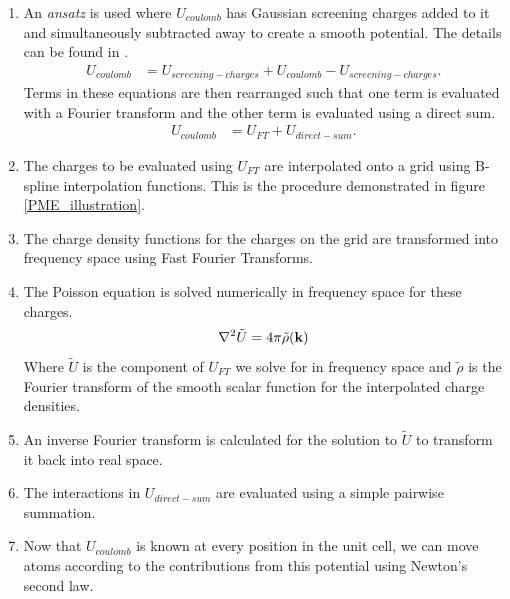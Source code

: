 \begin{enumerate}
	\item An \textit{ansatz}  is used where $U_{coulomb}$  has Gaussian screening charges added to it and simultaneously subtracted away to create a smooth potential. The details can be found in \cite{shan2005}.
		\begin{equation}
			\begin{aligned}
			U_{coulomb} &= U_{screening-charges} + U_{coulomb}  - U_{screening-charges}.
			\end{aligned}
		\end{equation}
		Terms in these equations are then rearranged such that one term is evaluated with a Fourier transform and the other term is evaluated using a direct sum.
		\begin{equation}
			\begin{aligned}
			U_{coulomb} &= U_{FT}  + U_{direct-sum}.
			\end{aligned}
		\end{equation}
	\item The charges to be evaluated using $U_{FT}$ are interpolated onto a grid using B-spline interpolation functions. This is the procedure demonstrated in figure \ref{PME_illustration}.
	\item The charge density functions for the charges on the grid are transformed into frequency space using Fast Fourier Transforms.
	\item The Poisson equation is solved numerically in frequency space for these charges.
		\begin{equation}	
			\nabla^2\tilde{U} = 4\pi \tilde{\rho}(\bold{k})
		\end{equation}	
		Where $\tilde{U}$ is the component of $U_{FT}$ we solve for in frequency space and $\tilde{\rho}$ is the Fourier transform of the smooth scalar function for the interpolated charge densities. 
	\item An inverse Fourier transform is calculated for the solution to $\tilde{U}$ to transform it back into real space. 
	\item The interactions in $U_{direct-sum}$ are evaluated using a simple pairwise summation.
	\item Now that $U_{coulomb}$ is known at every position in the unit cell, we can move atoms according to the contributions from this potential using Newton's second law.
\end{enumerate}

